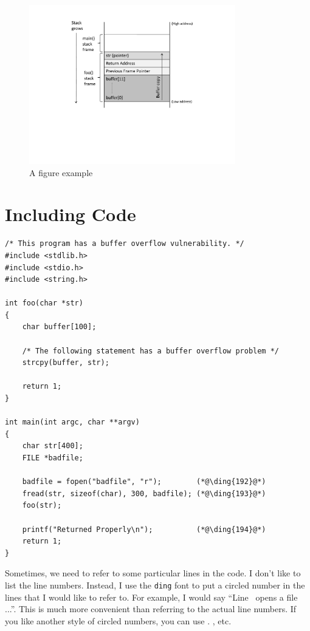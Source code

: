 \begin{figure}[htb]
\begin{center}
\includegraphics[width=0.8\textwidth]{./figure.pdf}
\end{center}
\caption{A figure example}
\label{fig:example}
\end{figure}
 



\section{Including Code}



\begin{lstlisting}[caption={The vulnerable program (\texttt{stack.c})},
                   label={buffer:stack_program}]
/* This program has a buffer overflow vulnerability. */
#include <stdlib.h>
#include <stdio.h>
#include <string.h>

int foo(char *str)
{
    char buffer[100];

    /* The following statement has a buffer overflow problem */
    strcpy(buffer, str);

    return 1;
}

int main(int argc, char **argv)
{
    char str[400];
    FILE *badfile;

    badfile = fopen("badfile", "r");        (*@\ding{192}@*)
    fread(str, sizeof(char), 300, badfile); (*@\ding{193}@*)
    foo(str);

    printf("Returned Properly\n");          (*@\ding{194}@*)
    return 1;
}
\end{lstlisting}
 

Sometimes, we need to refer to some particular lines in the code. I don't like to list 
the line numbers. Instead, I use the \texttt{ding} font to 
put a circled number in the lines that I would like to refer to. 
For example, I would say ``Line~ opens a file ...''. 
This is much more convenient than referring to the actual line numbers. 
If you like another style of circled numbers, you can use
. , etc.






